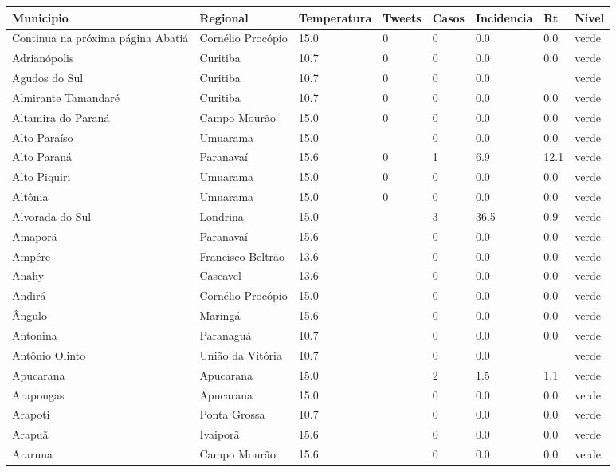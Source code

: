 \begin{longtable}{l|lllllll}
  \hline
Municipio & Regional & Temperatura & Tweets & Casos & Incidencia & Rt & Nivel \\ 
  \hline
\endhead
\hline
{\footnotesize Continua na próxima página}
\endfoot
\endlastfoot
Abatiá & Cornélio Procópio & 15.0 & 0 & 0 & 0.0 & 0.0 & verde \\ 
  Adrianópolis & Curitiba & 10.7 & 0 & 0 & 0.0 & 0.0 & verde \\ 
  Agudos do Sul & Curitiba & 10.7 & 0 & 0 & 0.0 &  & verde \\ 
  Almirante Tamandaré & Curitiba & 10.7 & 0 & 0 & 0.0 & 0.0 & verde \\ 
  Altamira do Paraná & Campo Mourão & 15.0 & 0 & 0 & 0.0 & 0.0 & verde \\ 
  Alto Paraíso & Umuarama & 15.0 &  & 0 & 0.0 & 0.0 & verde \\ 
  Alto Paraná & Paranavaí & 15.6 & 0 & 1 & 6.9 & 12.1 & verde \\ 
  Alto Piquiri & Umuarama & 15.0 & 0 & 0 & 0.0 & 0.0 & verde \\ 
  Altônia & Umuarama & 15.0 & 0 & 0 & 0.0 & 0.0 & verde \\ 
  Alvorada do Sul & Londrina & 15.0 &  & 3 & 36.5 & 0.9 & verde \\ 
  Amaporã & Paranavaí & 15.6 &  & 0 & 0.0 & 0.0 & verde \\ 
  Ampére & Francisco Beltrão & 13.6 &  & 0 & 0.0 & 0.0 & verde \\ 
  Anahy & Cascavel & 13.6 &  & 0 & 0.0 & 0.0 & verde \\ 
  Andirá & Cornélio Procópio & 15.0 &  & 0 & 0.0 & 0.0 & verde \\ 
  Ângulo & Maringá & 15.6 &  & 0 & 0.0 & 0.0 & verde \\ 
  Antonina & Paranaguá & 10.7 &  & 0 & 0.0 & 0.0 & verde \\ 
  Antônio Olinto & União da Vitória & 10.7 &  & 0 & 0.0 &  & verde \\ 
  Apucarana & Apucarana & 15.0 &  & 2 & 1.5 & 1.1 & verde \\ 
  Arapongas & Apucarana & 15.0 &  & 0 & 0.0 & 0.0 & verde \\ 
  Arapoti & Ponta Grossa & 10.7 &  & 0 & 0.0 & 0.0 & verde \\ 
  Arapuã & Ivaiporã & 15.6 &  & 0 & 0.0 & 0.0 & verde \\ 
  Araruna & Campo Mourão & 15.6 &  & 0 & 0.0 & 0.0 & verde \\ 

\end{longtable}
